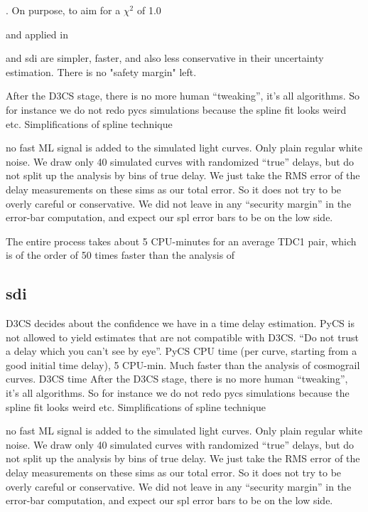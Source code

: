 \documentclass[traditabstract]{aa}
\begin{document}
. On purpose, to aim for a $\chi^2$ of 1.0





 and applied in 

 and sdi are simpler, faster, and also less conservative in their uncertainty estimation. There is no "safety margin" left.



After the D3CS stage, there is no more human “tweaking”, it's all algorithms. So for instance we do not redo pycs simulations because the spline fit looks weird etc.
Simplifications of spline technique

no fast ML signal is added to the simulated light curves. Only plain regular white noise.
We draw only 40 simulated curves with randomized “true” delays, but do not split up the analysis by bins of true delay. We just take the RMS error of the delay measurements on these sims as our total error.
So it does not try to be overly careful or conservative. We did not leave in any “security margin” in the error-bar computation, and expect our spl error bars to be on the low side.


The entire process takes about 5 CPU-minutes for an average TDC1 pair, which is of the order of 50 times faster than the analysis of 



\subsection{sdi}


D3CS decides about the confidence we have in a time delay estimation. PyCS is not allowed to yield estimates that are not compatible with D3CS. “Do not trust a delay which you can't see by eye”.
PyCS CPU time (per curve, starting from a good initial time delay), 5 CPU-min. Much faster than the analysis of cosmograil curves.
D3CS time
After the D3CS stage, there is no more human “tweaking”, it's all algorithms. So for instance we do not redo pycs simulations because the spline fit looks weird etc.
Simplifications of spline technique

no fast ML signal is added to the simulated light curves. Only plain regular white noise.
We draw only 40 simulated curves with randomized “true” delays, but do not split up the analysis by bins of true delay. We just take the RMS error of the delay measurements on these sims as our total error.
So it does not try to be overly careful or conservative. We did not leave in any “security margin” in the error-bar computation, and expect our spl error bars to be on the low side.
\end{document}
